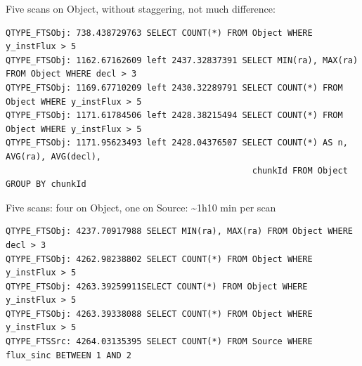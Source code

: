 \documentclass[DM,toc]{lsstdoc}
\begin{document}
Five scans on Object, without staggering, not much difference:

\begin{verbatim}
QTYPE_FTSObj: 738.438729763 SELECT COUNT(*) FROM Object WHERE y_instFlux > 5
QTYPE_FTSObj: 1162.67162609 left 2437.32837391 SELECT MIN(ra), MAX(ra) FROM Object WHERE decl > 3
QTYPE_FTSObj: 1169.67710209 left 2430.32289791 SELECT COUNT(*) FROM Object WHERE y_instFlux > 5
QTYPE_FTSObj: 1171.61784506 left 2428.38215494 SELECT COUNT(*) FROM Object WHERE y_instFlux > 5
QTYPE_FTSObj: 1171.95623493 left 2428.04376507 SELECT COUNT(*) AS n, AVG(ra), AVG(decl),
                                                 chunkId FROM Object GROUP BY chunkId
\end{verbatim}

Five scans: four on Object, one on Source: \textasciitilde{}1h10 min per
scan

\begin{verbatim}
QTYPE_FTSObj: 4237.70917988 SELECT MIN(ra), MAX(ra) FROM Object WHERE decl > 3
QTYPE_FTSObj: 4262.98238802 SELECT COUNT(*) FROM Object WHERE y_instFlux > 5
QTYPE_FTSObj: 4263.39259911SELECT COUNT(*) FROM Object WHERE y_instFlux > 5
QTYPE_FTSObj: 4263.39338088 SELECT COUNT(*) FROM Object WHERE y_instFlux > 5
QTYPE_FTSSrc: 4264.03135395 SELECT COUNT(*) FROM Source WHERE flux_sinc BETWEEN 1 AND 2
\end{verbatim}


\end{document}
